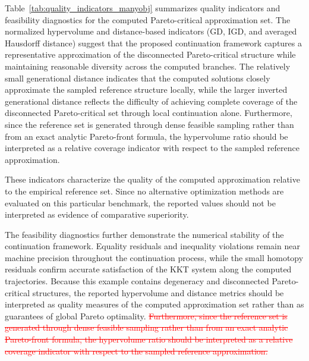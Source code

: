 \documentclass[11pt,pdflatex,sn-mathphys-ay]{sn-jnl}%
\theoremstyle{definition}
\theoremstyle{thmstyleone}%
\theoremstyle{thmstyletwo}%
\theoremstyle{thmstylethree}%
\newcommand{\del}[1]{\textcolor{red}{\sout{#1}}}
\newcommand{\add}[1]{\textcolor{revisionblue}{#1}}
\begin{document}
	Table~\ref{tab:quality_indicators_manyobj} summarizes quality indicators and feasibility diagnostics for the computed Pareto-critical approximation set. The normalized hypervolume and distance-based indicators (GD, IGD, and averaged Hausdorff distance) suggest that the proposed continuation framework captures a representative approximation of the disconnected Pareto-critical structure while maintaining reasonable diversity across the computed branches. The relatively small generational distance indicates that the computed solutions closely approximate the sampled reference structure locally, while the larger inverted generational distance reflects the difficulty of achieving complete coverage of the disconnected Pareto-critical set through local continuation alone. Furthermore, since the reference set is generated through dense feasible sampling rather than from an exact analytic Pareto-front formula, the hypervolume ratio should be interpreted as a relative coverage indicator with respect to the sampled reference approximation.
	
	
	\add{These indicators characterize the quality
		of the computed approximation relative to
		the empirical reference set. Since no
		alternative optimization methods are evaluated
		on this particular benchmark, the reported
		values should not be interpreted as evidence
		of comparative superiority.}
	
	
	The feasibility diagnostics further demonstrate the numerical stability of the continuation framework. Equality residuals and inequality violations remain near machine precision throughout the continuation process, while the small homotopy residuals confirm accurate satisfaction of the KKT system along the computed trajectories. Because this example contains degeneracy and disconnected Pareto-critical structures, the reported hypervolume and distance metrics should be interpreted as quality measures of the computed approximation set rather than as guarantees of global Pareto optimality. \del{Furthermore, since the reference set is generated through dense feasible sampling rather than from an exact analytic Pareto-front formula, the hypervolume ratio should be interpreted as a relative coverage indicator with respect to the sampled reference approximation.}
	
\end{document}
